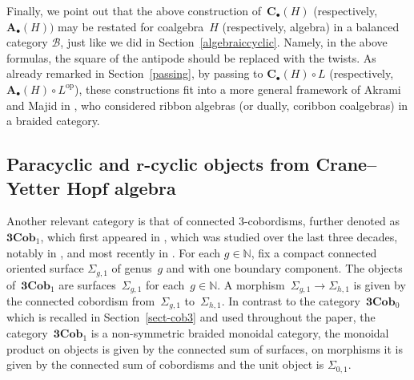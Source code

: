 \documentclass[pdftex]{sigma}
\numberwithin{equation}{section}
\newcommand{\mc}{\mathcal}
\newcommand{\opp}{\mathrm{op}}
\newcommand{\N}{\mathbb{N}}
\newcommand{\Cob}{\textbf{Cob}}
\newcommand{\conncob}{\textbf{3Cob}_1}
\begin{document}
Finally, we point out that the above construction of~$\textbf{C}_\bullet(H)$ (respectively,~$\textbf{A}_\bullet(H))$ may be restated for coalgebra~$H$ (respectively, algebra) in a balanced category $\mc B$, just like we did in Section~\ref{algebraiccyclic}. Namely, in the above formulas, the square of the antipode should be replaced with the twists. As already remarked in Section~\ref{passing}, by passing to $\textbf{C}_\bullet(H)\circ L$ (respectively,~$\textbf{A}_\bullet(H)\circ L^\opp$), these constructions fit into a more general framework of Akrami and Majid in \cite{cycliccocycles}, who considered ribbon algebras (or dually, coribbon coalgebras) in a braided category.



\subsection[Paracyclic and r-cyclic objects from Crane--Yetter Hopf algebra]{Paracyclic and $\boldsymbol{r}$-cyclic objects from Crane--Yetter Hopf algebra} \label{cy para}
Another relevant category is that of connected $3$-cobordisms, further denoted as $\conncob$, which first appeared in \cite{kerler}, which was studied over the last three decades, notably in \cite{asaeda, bobtcheva-piergallini, Ha, kerler2}, and most recently in \cite{beliakova-derenzi}.
For each $g\in \N$, fix a compact connected oriented surface $\Sigma_{g,1}$ of genus~$g$ and with one boundary component.
The objects of~$\conncob$ are surfaces~$\Sigma_{g,1}$ for each~$g\in \N$.
A morphism~$\Sigma_{g,1} \to \Sigma_{h,1}$ is given by the connected cobordism from~$\Sigma_{g,1}$ to~$\Sigma_{h,1}$.
In contrast to the category~$\textbf{3}\Cob_0$ which is recalled in Section~\ref{sect-cob3} and used throughout the paper, the category~$\conncob$ is a non-symmetric braided monoidal category, the monoidal product on objects is given by the connected sum of surfaces, on morphisms it is given by the connected sum of cobordisms and the unit object is $\Sigma_{0,1}$.
\end{document}
